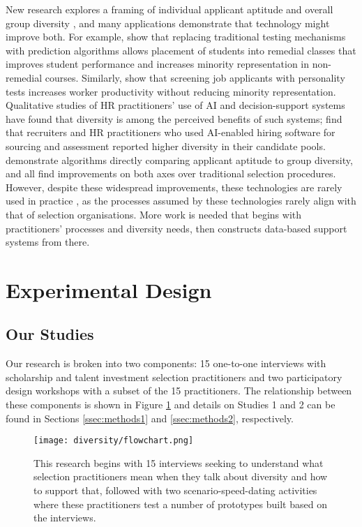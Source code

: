 New research explores a framing of individual applicant aptitude and overall group diversity \cite{noray2023systemic}, and many applications demonstrate that technology might improve both. For example, \textcite{bergman2021seven} show that replacing traditional testing mechanisms with prediction algorithms allows placement of students into remedial classes that improves student performance and increases minority representation in non-remedial courses. Similarly, \textcite{autor2008does} show that screening job applicants with personality tests increases worker productivity without reducing minority representation. Qualitative studies of HR practitioners' use of AI and decision-support systems have found that diversity is among the perceived benefits of such systems; \textcite{li2021algorithmic} find that recruiters and HR practitioners who used AI-enabled hiring software for sourcing and assessment reported higher diversity in their candidate pools.  \textcite{huppenkothen2020entrofy,kleinberg2018algorithmic,schumann2017diverse} demonstrate algorithms directly comparing applicant aptitude to group diversity, and all find improvements on both axes over traditional selection procedures. However, despite these widespread improvements, these technologies are rarely used in practice \cite{page_diversity_2017}, as the processes assumed by these technologies rarely align with that of selection organisations. More work is needed that begins with practitioners' processes and diversity needs, then constructs data-based support systems from there.

\section{Experimental Design}\label{sec:methods}
\subsection{Our Studies}
Our research is broken into two components: 15 one-to-one interviews with scholarship and talent investment selection practitioners and two participatory design workshops with a subset of the 15 practitioners. The relationship between these components is shown in Figure \ref{fig:flowchart} and details on Studies 1 and 2 can be found in Sections \ref{ssec:methods1} and \ref{ssec:methods2}, respectively.

\begin{figure}[htbp]
    \centering
    \texttt{[image: diversity/flowchart.png]}
    \caption{This research begins with 15 interviews seeking to understand what selection practitioners mean when they talk about diversity and how to support that, followed with two scenario-speed-dating activities where these practitioners test a number of prototypes built based on the interviews.}
    \label{fig:flowchart}
\end{figure}

